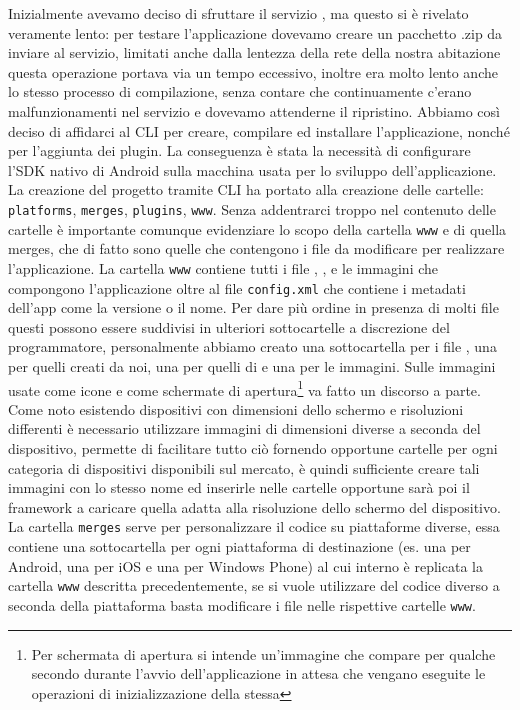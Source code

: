 			Inizialmente avevamo deciso di sfruttare il servizio \pgb{}, 
			ma questo si è rivelato veramente lento: per testare l'applicazione 
			dovevamo creare un pacchetto .zip da inviare al servizio, limitati 
			anche dalla lentezza della rete della nostra abitazione questa operazione 
			portava via un tempo eccessivo, inoltre era molto lento anche 
			lo stesso processo di compilazione, senza contare che continuamente 
			c'erano malfunzionamenti nel servizio e dovevamo attenderne il ripristino. 
			Abbiamo così deciso di affidarci al CLI per creare, compilare ed 
			installare l'applicazione, nonché per l'aggiunta dei plugin. La 
			conseguenza è stata la necessità di configurare l'SDK nativo di Android
			sulla macchina usata per lo sviluppo dell'applicazione.
			La creazione del progetto tramite CLI ha portato alla creazione 
			delle cartelle: \texttt{platforms}, \texttt{merges}, \texttt{plugins}, \texttt{www}.
			Senza addentrarci troppo nel contenuto delle cartelle è importante 
			comunque evidenziare lo scopo della cartella \texttt{www} e di quella merges, 
			che di fatto sono quelle che contengono i file da modificare per 
			realizzare l'applicazione.
			La cartella \texttt{www} contiene tutti i file \html{}, \css{}, \js{} e le immagini
			che compongono l'applicazione oltre al file \texttt{config.xml} che contiene 
			i metadati dell'app come la versione o il nome. 
			Per dare più ordine in presenza di molti 
			file questi possono essere suddivisi in ulteriori sottocartelle a 
			discrezione del programmatore, personalmente abbiamo creato una sottocartella 
			per i file \css{}, 
			una per quelli \js{} creati da noi, una per quelli \js{} di \kendomob{} e 
			una per le immagini.
			Sulle immagini usate come icone e come schermate di apertura\footnote{
			Per schermata di apertura si intende un'immagine che compare per qualche 
			secondo durante l'avvio dell'applicazione in attesa che vengano eseguite 
			le operazioni di inizializzazione della stessa} va fatto 
			un discorso a parte. Come noto esistendo 
			dispositivi con dimensioni dello schermo e risoluzioni differenti 
			è necessario utilizzare immagini di dimensioni diverse a seconda 
			del dispositivo, \pg{} permette di facilitare tutto ciò fornendo 
			opportune cartelle per ogni categoria di dispositivi disponibili sul 
			mercato, è quindi sufficiente creare tali immagini con lo stesso nome 
			ed inserirle nelle cartelle opportune sarà poi il framework a caricare 
			quella adatta alla risoluzione dello schermo del dispositivo.
			La cartella \texttt{merges} serve per personalizzare il codice su piattaforme 
			diverse, essa contiene una sottocartella per ogni piattaforma di destinazione
			(es. una per Android, una per iOS e una per Windows Phone) 
			al cui interno è replicata la cartella \texttt{www} descritta precedentemente,
			se si vuole utilizzare del codice diverso a seconda della piattaforma 
			basta modificare i file nelle rispettive cartelle \texttt{www}.
			
